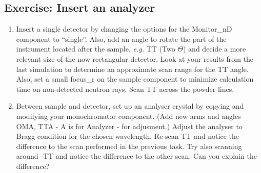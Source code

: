 \subsection{Exercise: Insert an analyzer}
\begin{enumerate}
\item{Insert a single detector by changing the options for the
    Monitor\_nD component to ``single''. Also, add an angle to rotate
    the part of the instrument located after the sample, \emph{e.g.} TT (Two
    $\Theta$) and decide a more relevant size of the now rectangular detector. Look at your results from the last simulation to
    determine an approximate scan range for the TT angle. Also,
    set a small focus\_r on the sample component to minimize
    calculation time on non-detected neutron rays. Scan TT across the
    powder lines.}
\item{Between sample and detector, set up an analyser crystal by
    copying and modifying your monochromator component. (Add new arms
    and angles OMA, TTA - A is for Analyzer - for adjusment.) 
    Adjust the analyser to Bragg condition
    for the chosen wavelength. Re-scan TT and notice the difference to
    the scan performed in the previous task. Try also scanning around
    -TT and notice the difference to the other scan. Can you explain
    the difference?}
\end{enumerate}
